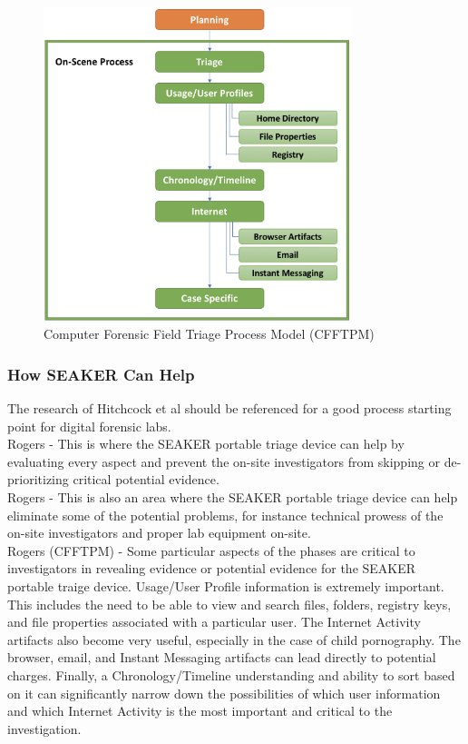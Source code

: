 \documentclass[12pt]{article}
\begin{document}
\begin{figure}[ht]
  \centering
    \includegraphics[width=0.8\textwidth]{images/CFFTPM.png}
  \caption{Computer Forensic Field Triage Process Model (CFFTPM)}
\end{figure}

\subsubsection{How SEAKER Can Help}
The research of Hitchcock et al\cite{hitchcock2016tiered} should be referenced for a good process starting point for
digital forensic labs.\\

Rogers -  This is where the SEAKER portable
triage device can help by evaluating every aspect and prevent the on-site investigators from skipping or
de-prioritizing critical potential evidence.\\

Rogers - This is also an area where the
SEAKER portable triage device can help eliminate some of the potential problems, for instance technical prowess of the
on-site investigators and proper lab equipment on-site.\\

Rogers (CFFTPM) - Some particular aspects of the phases are critical to investigators in revealing evidence or potential evidence for
the SEAKER portable traige device.  Usage/User Profile information is extremely important.  This includes the need to
be able to view and search files, folders, registry keys, and file properties associated with a particular user.  The
Internet Activity artifacts also become very useful, especially in the case of child pornography.  The browser, email,
and Instant Messaging artifacts can lead directly to potential charges.  Finally, a Chronology/Timeline understanding
and ability to sort based on it can significantly narrow down the possibilities of which user information and which
Internet Activity is the most important and critical to the investigation.\\
\end{document}
